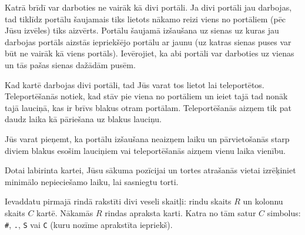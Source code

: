 \documentclass{boi2014-lv}
\newcommand{\constant}[1]{{\tt #1}}
\begin{document}
		Katrā brīdī var darboties ne vairāk kā divi portāli. Ja divi portāli jau darbojas, tad tiklīdz portālu šaujamais tiks lietots nākamo reizi viens no portāliem (pēc Jūsu izvēles) tiks aizvērts. Portālu šaujamā izšaušana uz sienas uz kuras jau darbojas portāls aizstās iepriekšējo portālu ar jaunu (uz katras sienas puses var būt ne vairāk kā viens portāls). Ievērojiet, ka abi portāli var darboties uz vienas un tās pašas sienas dažādām pusēm.

		Kad kartē darbojas divi portāli, tad Jūs varat tos lietot lai teleportētos. Teleportēšanās notiek, kad stāv pie viena no portāliem un ieiet tajā tad nonāk tajā lauciņā, kas ir brīvs blakus otram portālam. Teleportēšanās aizņem tik pat daudz laika kā pāriešana uz blakus lauciņu.

		Jūs varat pieņemt, ka portālu izšaušana neaizņem laiku un pārvietošanās starp diviem blakus esošim lauciņiem vai teleportēšanās aizņem vienu laika vienību.

    \Task
    
		Dotai labirinta kartei, Jūsu sākuma pozīcijai un tortes atrašanās vietai izrēķiniet minimālo nepieciešamo laiku, lai sasniegtu torti.

    \Input
		
		Ievaddatu pirmajā rindā rakstīti divi veseli skaitļi: rindu skaits $R$ un kolonnu skaits $C$ kartē. Nākamās $R$ rindas apraksta karti. Katra no tām satur $C$ simbolus: \constant{\#}, \constant{.}, \constant{S} vai \constant{C} (kuru nozīme aprakstīta iepriekš).
		
\end{document}

